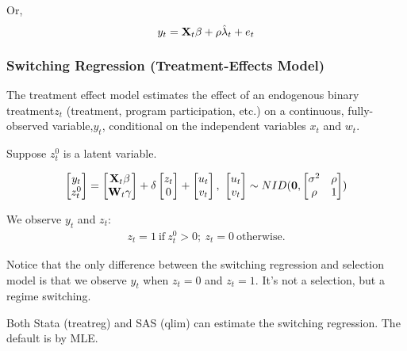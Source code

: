 Or,
\begin{equation}
y_t={\bf X}_t \beta + \rho \hat \lambda_t + e_t
\end{equation}

\subsubsection{Switching Regression (Treatment-Effects Model)}

The treatment effect model estimates the effect of an endogenous
binary treatment$z_t$ (treatment, program participation, etc.) on a
continuous, fully-observed variable,$y_t$, conditional on the
independent variables $x_t$ and $w_t$.

Suppose $z_t^0$ is a latent variable.

\begin{equation}
\begin{bmatrix}
y_t \\ z_t^0
\end{bmatrix}
=\begin{bmatrix} {\bf X}_t \beta \\ {\bf W}_t \gamma
\end{bmatrix}+ \delta \begin{bmatrix} {z_t} \\ 0
\end{bmatrix} +
\begin{bmatrix} u_t \\ v_t
\end{bmatrix}, \
\begin{bmatrix} u_t \\ v_t
\end{bmatrix} \sim NID({\bf 0},
\begin{bmatrix} \sigma^2 & \rho  \\ \rho  & 1
\end{bmatrix})
\end{equation}

We observe $y_t$ and $z_t$:
\begin{eqnarray}
  z_t  =  1  \ \mbox{if} \ z_t^0 > 0; \ z_t=0 \ \mbox{otherwise}.
\end{eqnarray}

Notice that the only difference between the switching regression and selection model is that we observe $y_t$ when $z_t=0$ and $z_t=1$.  It's not a selection, but a regime switching.

Both Stata (treatreg) and SAS (qlim) can estimate the switching regression.  The default is by MLE.
